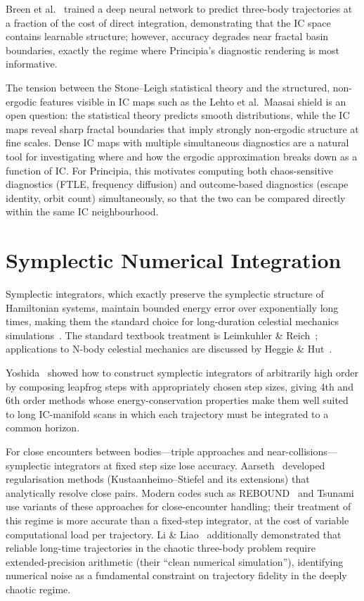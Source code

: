 \documentclass[11pt,a4paper]{article}
\begin{document}
Breen et al.~\cite{breen2020} trained a deep neural network to predict three-body trajectories
at a fraction of the cost of direct integration, demonstrating that the IC space contains
learnable structure; however, accuracy degrades near fractal basin boundaries, exactly the
regime where Principia's diagnostic rendering is most informative.

The tension between the Stone--Leigh statistical theory and the structured, non-ergodic
features visible in IC maps such as the Lehto et al.\ Maasai shield is an open question: the statistical theory
predicts smooth distributions, while the IC maps reveal sharp fractal boundaries that imply
strongly non-ergodic structure at fine scales.  Dense IC maps with multiple simultaneous
diagnostics are a natural tool for investigating where and how the ergodic approximation breaks
down as a function of IC.  For Principia, this motivates computing both chaos-sensitive
diagnostics (FTLE, frequency diffusion) and outcome-based diagnostics (escape identity, orbit
count) simultaneously, so that the two can be compared directly within the same IC neighbourhood.

\section{Symplectic Numerical Integration}

Symplectic integrators, which exactly preserve the symplectic structure of Hamiltonian systems,
maintain bounded energy error over exponentially long times, making them the standard choice for
long-duration celestial mechanics simulations~\cite{leimkuhler2004}.  The standard textbook
treatment is Leimkuhler \& Reich~\cite{leimkuhler2004}; applications to N-body celestial
mechanics are discussed by Heggie \& Hut~\cite{heggie2003}.

Yoshida~\cite{yoshida1990} showed how to construct symplectic integrators of arbitrarily high
order by composing leapfrog steps with appropriately chosen step sizes, giving 4th and 6th
order methods whose energy-conservation properties make them well suited to long IC-manifold
scans in which each trajectory must be integrated to a common horizon.

For close encounters between bodies---triple approaches and near-collisions---symplectic
integrators at fixed step size lose accuracy.  Aarseth~\cite{aarseth2003} developed
regularisation methods (Kustaanheimo--Stiefel and its extensions) that analytically resolve
close pairs.  Modern codes such as REBOUND~\cite{rein2012} and Tsunami~\cite{trani2024} use
variants of these approaches for close-encounter handling; their treatment of this regime is
more accurate than a fixed-step integrator, at the cost of variable computational load per
trajectory.  Li \& Liao~\cite{li2017} additionally demonstrated that reliable long-time
trajectories in the chaotic three-body problem require extended-precision arithmetic (their
``clean numerical simulation''), identifying numerical noise as a fundamental constraint on
trajectory fidelity in the deeply chaotic regime.
\end{document}
